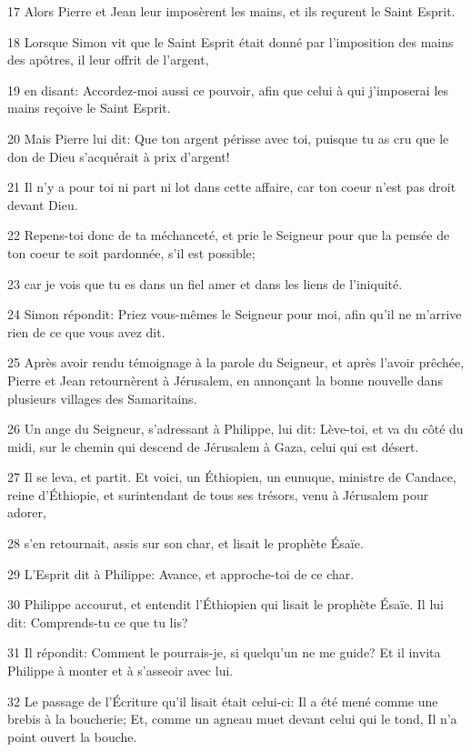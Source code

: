 \par 17 Alors Pierre et Jean leur imposèrent les mains, et ils reçurent le Saint Esprit.
\par 18 Lorsque Simon vit que le Saint Esprit était donné par l'imposition des mains des apôtres, il leur offrit de l'argent,
\par 19 en disant: Accordez-moi aussi ce pouvoir, afin que celui à qui j'imposerai les mains reçoive le Saint Esprit.
\par 20 Mais Pierre lui dit: Que ton argent périsse avec toi, puisque tu as cru que le don de Dieu s'acquérait à prix d'argent!
\par 21 Il n'y a pour toi ni part ni lot dans cette affaire, car ton coeur n'est pas droit devant Dieu.
\par 22 Repens-toi donc de ta méchanceté, et prie le Seigneur pour que la pensée de ton coeur te soit pardonnée, s'il est possible;
\par 23 car je vois que tu es dans un fiel amer et dans les liens de l'iniquité.
\par 24 Simon répondit: Priez vous-mêmes le Seigneur pour moi, afin qu'il ne m'arrive rien de ce que vous avez dit.
\par 25 Après avoir rendu témoignage à la parole du Seigneur, et après l'avoir prêchée, Pierre et Jean retournèrent à Jérusalem, en annonçant la bonne nouvelle dans plusieurs villages des Samaritains.
\par 26 Un ange du Seigneur, s'adressant à Philippe, lui dit: Lève-toi, et va du côté du midi, sur le chemin qui descend de Jérusalem à Gaza, celui qui est désert.
\par 27 Il se leva, et partit. Et voici, un Éthiopien, un eunuque, ministre de Candace, reine d'Éthiopie, et surintendant de tous ses trésors, venu à Jérusalem pour adorer,
\par 28 s'en retournait, assis sur son char, et lisait le prophète Ésaïe.
\par 29 L'Esprit dit à Philippe: Avance, et approche-toi de ce char.
\par 30 Philippe accourut, et entendit l'Éthiopien qui lisait le prophète Ésaïe. Il lui dit: Comprends-tu ce que tu lis?
\par 31 Il répondit: Comment le pourrais-je, si quelqu'un ne me guide? Et il invita Philippe à monter et à s'asseoir avec lui.
\par 32 Le passage de l'Écriture qu'il lisait était celui-ci: Il a été mené comme une brebis à la boucherie; Et, comme un agneau muet devant celui qui le tond, Il n'a point ouvert la bouche.
